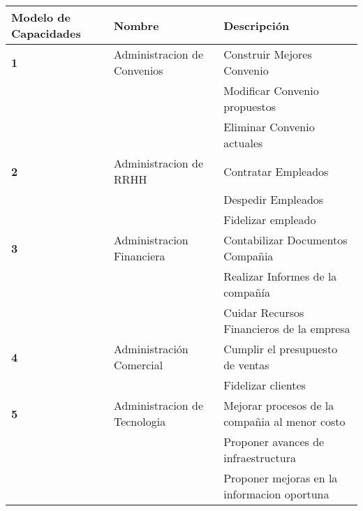\begin{table}[H]
\centering
\resizebox{17cm}{!} {
\begin{tabular}{|l|l|l|}
\hline
\textbf{Modelo de Capacidades} & \textbf{Nombre} & \textbf{Descripción} \\ \hline
\textbf{1} & Administracion de Convenios & Construir Mejores Convenio \\ \hline
 &  & Modificar Convenio propuestos \\ \hline
 &  & Eliminar Convenio actuales \\ \hline
\textbf{2} & Administracion de RRHH & Contratar Empleados \\ \hline
 &  & Despedir Empleados \\ \hline
 &  & Fidelizar empleado \\ \hline
\textbf{3} & Administracion Financiera & Contabilizar Documentos Compañia \\ \hline
 &  & Realizar Informes de la compañía \\ \hline
 &  & Cuidar Recursos Financieros de la empresa \\ \hline
\textbf{4} & Administración Comercial & Cumplir el presupuesto de ventas \\ \hline
\textbf{} &  & Fidelizar clientes \\ \hline
\textbf{5} & Administracion de Tecnologia & Mejorar procesos de la compañia al menor costo \\ \hline
 &  & Proponer avances de infraestructura \\ \hline
 &  & Proponer mejoras en la informacion oportuna \\ \hline
\end{tabular}
}
\end{table}